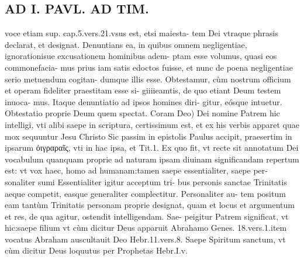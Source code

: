 \documentclass{article}
\begin{document}
\begin{pages}
\section*{AD I. PAVL. AD TIM. }
\marginpar{[ p.408. ]}\pstart voce etiam sup. cap.5.vers.21.vsus est, etsi maiesta- tem Dei vtraque phrasis declarat, et designat. Denuntians ea, in quibus omnem negligentiae, ignorationisue excusationem hominibus adem- ptam esse volumus, quasi eos commonefacia- mus prius iam satis edoctos fuisse, et nunc de poena negligentiae serio metuendum cogitan- dumque illis esse. Obtestamur, cùm nostrum officium et operam fideliter praestitam esse si- giiiieamtis, de quo etiant Deum testem inuoca- mus. Itaque denuntiatio ad ipsos homines diri- gitur, eósque intuetur. Obtestatio proprie Deum quem spectat.  \pend\pstart Coram Deo) Dei nomine Patrem hic intelligi, vti alibi saepe in scriptura, certissimum est, et ex his verbis apparet quae mox sequuntur Jesu Christo Sic passim in epistolis Paulus accipit, praesertim in ipsarum ὀιγραραῖς, vti in hac ipsa, et Tit.1. Ex quo fit, vt recte sit annotatum Dei vocabulum quanquam proprie ad naturam ipsam diuinam significandam repertum est: vt vox haec, homo ad humanam:tamen saepe essentialiter, saepe per- sonaliter sumi Essentialiter igitur acceptum tri- bus personis sanctae Trinitatis aeque competit, easque generaliter complectitur. Personaliter au- tem positum eam tantùm Trinitatis personam proprie designat, quam et locus et argumentum et res, de qua agitur, ostendit intelligendam. Sae- peigitur Patrem significat, vt hic:saepe filium vt cùm dicitur Deus apparuit Abrahamo Genes. 18.vers.1.item vocatus Abraham auscultauit Deo Hebr.11.vers.8. Saepe Spiritum sanctum, vt cùm dicitur Deus loquutus per Prophetas Hebr.I.v.  \pend

\end{pages}
\end{document}
